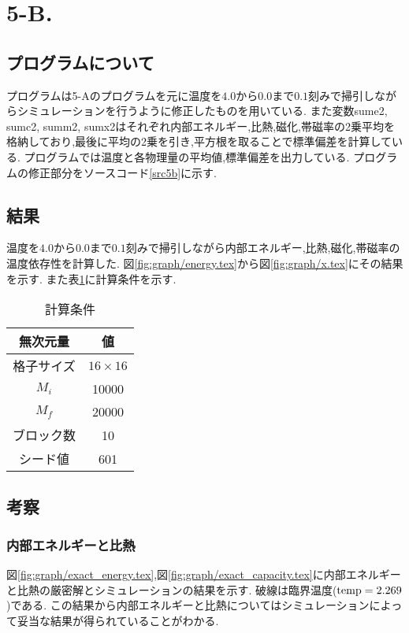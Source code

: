 \section{5-B.}
\subsection{プログラムについて}
プログラムは5-Aのプログラムを元に温度を$4.0$から$0.0$まで$0.1$刻みで掃引しながらシミュレーションを行うように修正したものを用いている.
また変数sume2, sumc2, summ2, sumx2はそれぞれ内部エネルギー,比熱,磁化,帯磁率の2乗平均を格納しており,最後に平均の2乗を引き,平方根を取ることで標準偏差を計算している.
プログラムでは温度と各物理量の平均値,標準偏差を出力している.
プログラムの修正部分をソースコード\ref{src5b}に示す.
\subsection{結果}
温度を$4.0$から$0.0$まで$0.1$刻みで掃引しながら内部エネルギー,比熱,磁化,帯磁率の温度依存性を計算した.
図\ref{fig:graph/energy.tex}から図\ref{fig:graph/x.tex}にその結果を示す.
また表\ref{tab:5b1}に計算条件を示す.
\begin{table}[h]
  \caption{計算条件}
  \label{tab:5b1}
  \centering
  \begin{tabular}{cc}
  \hline
  無次元量&値\\
  \hline \hline
  格子サイズ&$16\times 16$\\
  $M_i$&10000\\
  $M_f$&20000\\
  ブロック数&10\\
  シード値&601\\
  \hline
  \end{tabular}
  \end{table}
\newpage
\subsection{考察}
\subsubsection{内部エネルギーと比熱}
図\ref{fig:graph/exact_energy.tex},図\ref{fig:graph/exact_capacity.tex}に内部エネルギーと比熱の厳密解とシミュレーションの結果を示す.
破線は臨界温度(${\rm temp}=2.269$)である.
この結果から内部エネルギーと比熱についてはシミュレーションによって妥当な結果が得られていることがわかる.


